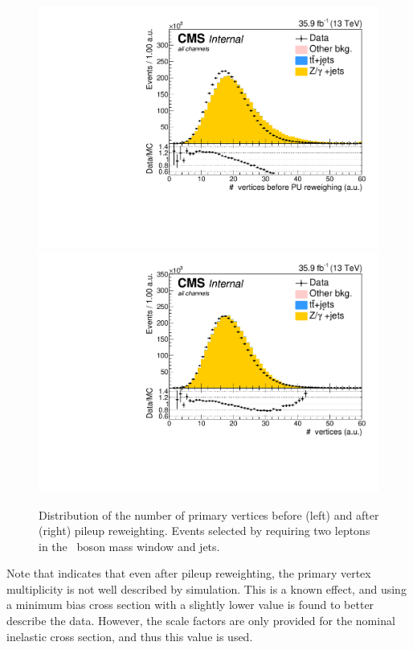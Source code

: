 \begin{figure}[htbp]
	\centering	
	\includegraphics[width=0.49\linewidth]{5_Eventselection/Figures/ReweighingNew/2lepcontrol_dilep_NbOfVertices_bfPU_all_Stack}
	\includegraphics[width=0.49\linewidth]{5_Eventselection/Figures/ReweighingNew/2lepcontrol_dilep_NbOfVertices_all_Stack}
	\caption{Distribution of the number of primary vertices before (left) and after (right) pileup reweighting. Events selected by requiring two leptons in the \PZ\ boson mass window and jets.}
	\label{fig:nbvertices}
\end{figure}

Note that  indicates that even after pileup reweighting, the primary vertex multiplicity is not well described by simulation. This is a known effect, and using  a minimum bias cross section with a slightly lower value is found to better describe the data. However, the scale factors are only provided for the nominal inelastic cross section, and thus this value is used.


